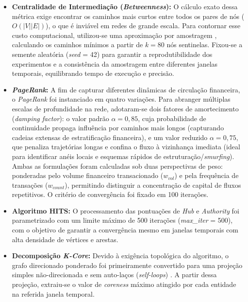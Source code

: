 \documentclass[a4paper,12pt,oneside,onecolumn,final,fleqn]{repUERJ}
\begin{document}
\begin{itemize}

    \item \textbf{Centralidade de Intermediação (\textit{Betweenness}):} O cálculo exato dessa métrica exige encontrar os caminhos mais curtos entre todos os pares de nós ($O(|V||E|)$), o que é inviável em redes de grande escala. Para contornar esse custo computacional, utilizou-se uma aproximação por amostragem \cite{riondato2016fast}, calculando os caminhos mínimos a partir de $k=80$ nós sentinelas. Fixou-se a semente aleatória (\textit{seed} = 42) para garantir a reprodutibilidade dos experimentos e a consistência da amostragem entre diferentes janelas temporais, equilibrando tempo de execução e precisão.
    
    \item \textbf{\textit{PageRank}:} A fim de capturar diferentes dinâmicas de circulação financeira, o \textit{PageRank} foi instanciado em quatro variações. Para abranger múltiplas escalas de profundidade na rede, adotaram-se dois fatores de amortecimento (\textit{damping factor}): o valor padrão $\alpha=0{,}85$, cuja probabilidade de continuidade propaga influência por caminhos mais longos (capturando cadeias extensas de estratificação financeira), e um valor reduzido $\alpha=0{,}75$, que penaliza trajetórias longas e confina o fluxo à vizinhança imediata (ideal para identificar anéis locais e esquemas rápidos de estruturação/\textit{smurfing}). Ambas as formulações foram calculadas sob duas perspectivas de peso: ponderadas pelo volume financeiro transacionado ($w_{vol}$) e pela frequência de transações ($w_{count}$), permitindo distinguir a concentração de capital de fluxos repetitivos. O critério de convergência foi fixado em 100 iterações.
    
    \item \textbf{Algoritmo HITS:} O processamento das pontuações de \textit{Hub} e \textit{Authority} foi parametrizado com um limite máximo de 500 iterações (\textit{max\_iter} = 500), com o objetivo de garantir a convergência mesmo em janelas temporais com alta densidade de vértices e arestas.
    
    \item \textbf{Decomposição \textit{K-Core}:} Devido à exigência topológica do algoritmo, o grafo direcionado ponderado foi primeiramente convertido para uma projeção simples não-direcionada e sem auto-laços (\textit{self-loops}) \cite{shin2018patterns}. A partir dessa projeção, extraiu-se o valor de \textit{coreness} máximo atingido por cada entidade na referida janela temporal.
\end{itemize}
\end{document}
